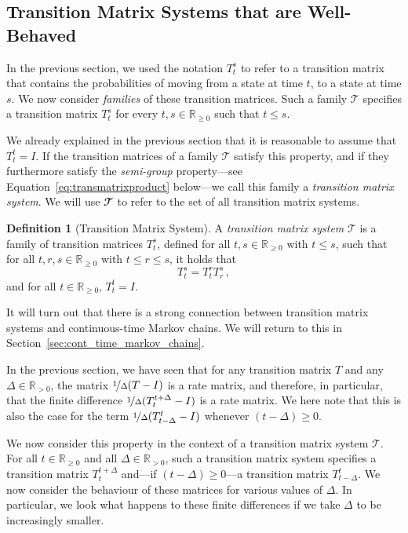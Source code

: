 \documentclass[10pt,a4paper]{paper}
\theoremstyle{definition}
\newtheorem{definition}{Definition}
\newcommand{\reals}{\mathbb{R}}
\newcommand{\realspos}{\reals_{>0}}
\newcommand{\realsnonneg}{\reals_{\geq 0}}
\begin{document}
\subsection{Transition Matrix Systems that are Well-Behaved}\label{subsec:well_behaved_systems}

In the previous section, we used the notation $T_t^s$ to refer to a transition matrix that contains the probabilities of moving from a state at time $t$, to a state at time $s$. We now consider \emph{families} of these transition matrices. Such a family $\mathcal{T}$ specifies a transition matrix $T_t^s$ for every $t,s\in\realsnonneg$ such that $t\leq s$. 

We already explained in the previous section that it is reasonable to assume that $T_t^t=I$. If the transition matrices of a family $\mathcal{T}$ satisfy this property, and if they furthermore satisfy the \emph{semi-group} property---see Equation~\ref{eq:transmatrixproduct} below---we call this family a \emph{transition matrix system}. We will use $\mathbfcal{T}$ to refer to the set of all transition matrix systems.

\begin{definition}[Transition Matrix System]\label{def:trans_mat_system}
A \emph{transition matrix system} $\mathcal{T}$ is a family of transition matrices $T_t^s$, defined for all $t,s\in\realsnonneg$ with $t\leq s$, such that for all $t,r,s\in\realsnonneg$ with $t\leq r\leq s$, it holds that
\begin{equation}\label{eq:transmatrixproduct}
T_t^s=T_t^r T_r^s\,,
\end{equation}
and for all $t\in\realsnonneg$, $T_t^t=I$.
\end{definition}
It will turn out that there is a strong connection between transition matrix systems and continuous-time Markov chains. We will return to this in Section~\ref{sec:cont_time_markov_chains}.

In the previous section, we have seen that for any transition matrix $T$ and any $\Delta\in\realspos$, the matrix $\nicefrac{1}{\Delta}(T - I)$ is a rate matrix, and therefore, in particular, that the finite difference $\nicefrac{1}{\Delta}(T_t^{t+\Delta} - I)$ is a rate matrix. We here note that this is also the case for the term $\nicefrac{1}{\Delta}(T_{t-\Delta}^t - I)$ whenever $(t-\Delta)\geq0$.

We now consider this property in the context of a transition matrix system $\mathcal{T}$. For all $t\in\realsnonneg$ and all $\Delta\in\realspos$, such a transition matrix system specifies a transition matrix $T_t^{t+\Delta}$ and---if $(t-\Delta)\geq0$---a transition matrix $T_{t-\Delta}^t$. We now consider the behaviour of these matrices for various values of $\Delta$. In particular, we look what happens to these finite differences if we take $\Delta$ to be increasingly smaller. 
\end{document}
